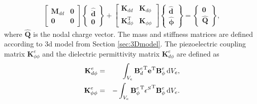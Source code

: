 \documentclass[11pt,a4paper,final]{report}
\theoremstyle{plain}
\begin{document}
\begin{eqnarray}
	\left [\begin{array}{cc}
		\textbf{M}_{dd} & \textbf{0}\\
		\textbf{0} & \textbf{0}
	\end{array}\right]
	\left \{\begin{array}{c}
		\widehat{\ddot{\textbf{d}}} \\
		\textbf{0}
	\end{array}\right \} +
	\left [\begin{array}{cc}
		\textbf{K}_{dd} & \textbf{K}_{d \phi}\\
		\textbf{K}_{d \phi}^{\mathrm{T}} & \textbf{K}_{\phi \phi}
	\end{array}\right]
	\left \{\begin{array}{c}
		\widehat{\textbf{d}} \\
		\widehat{\boldsymbol{\phi}}
	\end{array}\right \}  = 
	\left \{\begin{array}{c}
		\textbf{0}\\
		\widehat{\textbf{Q}}
	\end{array}\right \},
	\label{eq:pzt_sem}
\end{eqnarray}
where \(\widehat{\textbf{Q}}\) is the nodal charge vector.
The mass and stiffness matrices are defined according to \ac{3d} model from Section \ref{sec:3Dmodel}.
The piezoelectric coupling matrix \(\textbf{K}_{\phi \phi}^e\) and the dielectric permittivity matrix \(\textbf{K}_{d \phi}^e\) are defined as
\begin{eqnarray}
	\textbf{K}_{d\phi}^e & = & \int_{V_e}{\textbf{B}_d^e}^{\mathrm{T}}\textbf{e}^{\mathrm{T}} \textbf{B}_{\phi}^e \mathop{}\!\mathrm{d} V_e,\\
	\textbf{K}_{\phi \phi}^e & = & -\int_{V_e}{\textbf{B}_{\phi}^e}^{\mathrm{T}} 
	{\textbf{\(\epsilon\)}^S}^{\mathrm{T}} \textbf{B}_{\phi}^e \mathop{}\!\mathrm{d} V_e.
\end{eqnarray}
\end{document}
